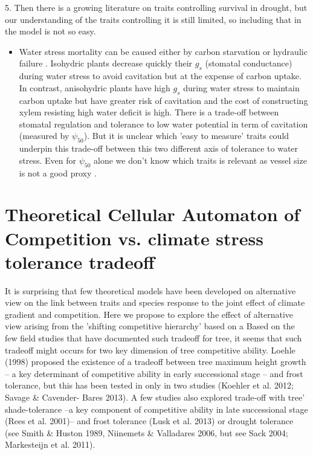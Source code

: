 \documentclass[a4paper,11pt]{article}
\begin{document}
5. Then there is a growing literature on traits controlling survival in drought, but our understanding of the traits controlling it is still limited, so including that in the model is not so easy.

\begin{itemize}
\item Water stress mortality can be caused either by carbon starvation or hydraulic failure \citep{McDowell-2008,McDowell-2011,Skelton-2015}. Isohydric plants decrease quickly their $g_s$ (stomatal conductance) during water stress to avoid cavitation but at the expense of carbon uptake. In contrast, anisohydric plants have high $g_s$ during water stress to maintain carbon uptake but have greater risk of cavitation and the cost of constructing xylem resisting high water deficit is high. There is a trade-off between stomatal regulation and tolerance to low water potential in term of cavitation (measured by $\psi_{50}$). But it is unclear which 'easy to measure' traits could underpin this trade-off between this two different axis of tolerance to water stress. Even for $\psi_{50}$ alone we don't know which traits is relevant as vessel size is not a good proxy \citep{Maherali-2004}.
\end{itemize}



\clearpage

\section{Theoretical Cellular Automaton of Competition vs. climate stress tolerance tradeoff}

It is surprising that few theoretical models have been developed on alternative view on the link between traits and species response to the joint effect of climate gradient and competition. 
Here we propose to explore the effect of alternative view arising from the 'shifting competitive hierarchy' based on a 
Based on the few field studies that have documented such tradeoff for tree, it seems that such tradeoff might occurs for two key dimension of tree competitive ability. Loehle (1998) proposed the existence of a tradeoff between tree maximum height growth – a key determinant of competitive ability in early successional stage – and frost tolerance, but this has been tested in only in two studies (Koehler et al. 2012; Savage \& Cavender- Bares 2013). A few studies also explored trade-off with tree’ shade-tolerance –a key component of competitive ability in late successional stage (Rees et al. 2001)– and frost tolerance (Lusk et al. 2013) or drought tolerance (see Smith \& Huston 1989, Niinemets \& Valladares 2006, but see Sack 2004; Markesteijn et al. 2011).
\end{document}
